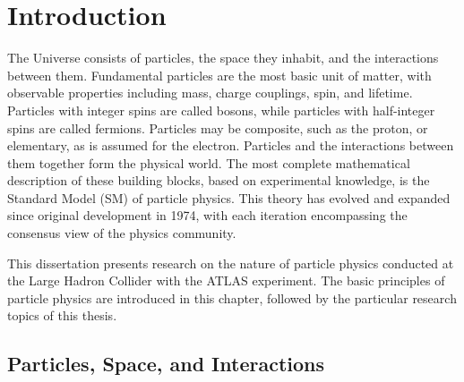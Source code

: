 \chapter{Introduction}



The Universe consists of particles, the space they inhabit, and the interactions between them.
Fundamental particles are the most basic unit of matter, with observable properties including mass, charge couplings, spin, and lifetime.
Particles with integer spins are called bosons, while particles with half-integer spins are called fermions.
Particles may be composite, such as the proton, or elementary, as is assumed for the electron.
Particles and the interactions between them together form the physical world.
The most complete mathematical description of these building blocks, based on experimental knowledge, is the Standard Model (SM) of particle physics.
This theory has evolved and expanded since original development in 1974, with each iteration encompassing the consensus view of the physics community.

This dissertation presents research on the nature of particle physics conducted at the Large Hadron Collider with the ATLAS experiment. 
The basic principles of particle physics are introduced in this chapter, followed by the particular research topics of this thesis.

\section{Particles, Space, and Interactions}

